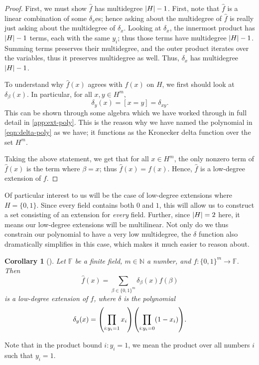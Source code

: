 \documentclass[english,12pt]{reedthesis}
\theoremstyle{plain}
\newtheorem{cor}[cor]{Corollary}
\theoremstyle{definition}
\theoremstyle{remark}
\DeclarePairedDelimiter{\abs}{\lvert}{\rvert}
\begin{document}
\begin{proof}
  First, we must show $\hat{f}$ has multidegree $\abs{H} - 1$. First, note that
  $\hat{f}$ is a linear combination of some $\delta_{x}$es; hence asking about the
  multidegree of $\hat{f}$ is really just asking about the multidegree of
  $\delta_{x}$. Looking at $\delta_{x}$, the innermost product has $\abs{H} - 1$ terms,
  each with the same $y_{i}$; thus those terms have multidegree $\abs{H} - 1$.
  Summing terms preserves their multidegree, and the outer product iterates over
  the variables, thus it preserves multidegree as well. Thus, $\delta_{x}$ has
  multidegree $\abs{H} - 1$.

  To understand why $\hat{f}(x)$ agrees with $f(x)$ on $H$, we first should look
  at $\delta_{\beta}(x)$. In particular, for all $x, y \in H^{m}$,
  \begin{equation}\label{eqn:delta-is-delta}
    \delta_{y}(x) = [x = y] = \delta_{xy}.
  \end{equation}
  This can be shown through some algebra which we have worked through in full
  detail in \cref{app:ext-poly}. This is the reason why we have named the
  polynomial in \cref{eqn:delta-poly} as we have; it functions as the Kronecker
  delta function over the set $H^{m}$.

  Taking the above statement, we get that for all $x \in H^{m}$, the only nonzero
  term of $\hat{f}(x)$ is the term where $\beta = x$; thus $\hat{f}(x) = f(x)$.
  Hence, $\hat{f}$ is a low-degree extension of $f$.
\end{proof}

Of particular interest to us will be the case of low-degree extensions where
$H = \{0, 1\}$. Since every field contains both $0$ and $1$, this will allow us
to construct a set consisting of an extension for \emph{every} field. Further,
since $\abs{H} = 2$ here, it means our low-degree extensions will be
multilinear. Not only do we thus constrain our polynomial to have a very low
multidegree, the $\delta$ function also dramatically simplifies in this case, which
makes it much easier to reason about.

\begin{cor}[{\cite[]{AW09}}]\label{cor:low-degree-boolean}
  Let $\mathbb{F}$ be a finite field, $m \in \mathbb{N}$ a number, and
  $f\colon \{0, 1\}^{m} \rightarrow \mathbb{F}$. Then
  \begin{equation}\label{eqn:low-deg-ext-small}
    \hat{f}(x) = \sum_{\beta \in \{0, 1\}^{m}}\delta_{\beta}(x)f(\beta)
  \end{equation}
  is a low-degree extension of $f$, where $\delta$ is the polynomial
  \begin{equation}\label{eqn:delta-poly-small}
    \delta_{y}(x) = \mleft(\prod_{i:y_{i}=1}x_{i}\mright)\mleft(\prod_{i:y_{i}=0}(1 - x_{i})\mright).
  \end{equation}
\end{cor}
Note that in the product bound $i:y_{i} = 1$, we mean the product over all
numbers $i$ such that $y_{i} = 1$.
\end{document}
